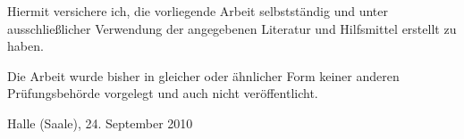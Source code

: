Hiermit versichere ich, die vorliegende Arbeit selbstständig und unter ausschließlicher Verwendung der angegebenen Literatur und Hilfsmittel erstellt
zu haben.

Die Arbeit wurde bisher in gleicher oder ähnlicher Form keiner anderen Prüfungsbehörde vorgelegt und auch nicht veröffentlicht.

\vspace{10ex}

Halle (Saale), 24. September 2010 
